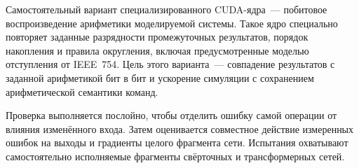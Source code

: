 Самостоятельный вариант специализированного CUDA-ядра~--- побитовое
воспроизведение арифметики моделируемой системы.
Такое ядро специально повторяет заданные разрядности промежуточных
результатов, порядок накопления и правила округления, включая
предусмотренные моделью отступления от IEEE~754.
Цель этого варианта~--- совпадение результатов с заданной арифметикой
бит в бит и ускорение симуляции с сохранением арифметической
семантики команд.

Проверка выполняется послойно, чтобы отделить ошибку самой операции
от влияния изменённого входа. Затем оценивается совместное действие
измеренных ошибок на выходы и градиенты целого фрагмента сети.
Испытания охватывают самостоятельно исполняемые фрагменты
свёрточных и трансформерных сетей.
